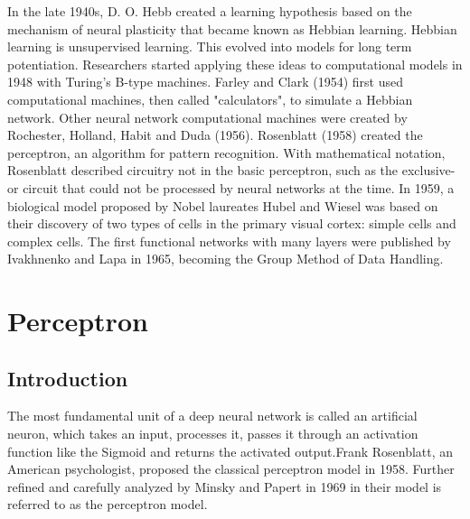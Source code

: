 \documentclass[12pt,times,a4paper]{report}
\begin{document}
{{\begin{normalsize}
In the late 1940s, D. O. Hebb created a learning hypothesis based on the mechanism of neural plasticity that became known as Hebbian learning. Hebbian learning is unsupervised learning. This evolved into models for long term potentiation. Researchers started applying these ideas to computational models in 1948 with Turing's B-type machines. Farley and Clark (1954) first used computational machines, then called "calculators", to simulate a Hebbian network. Other neural network computational machines were created by Rochester, Holland, Habit and Duda (1956). Rosenblatt (1958) created the perceptron, an algorithm for pattern recognition. With mathematical notation, Rosenblatt described circuitry not in the basic perceptron, such as the exclusive-or circuit that could not be processed by neural networks at the time. In 1959, a biological model proposed by Nobel laureates Hubel and Wiesel was based on their discovery of two types of cells in the primary visual cortex: simple cells and complex cells. The first functional networks with many layers were published by Ivakhnenko and Lapa in 1965, becoming the Group Method of Data Handling.


\chapter{\fontsize{16}{14}\textbf{Perceptron\hfill}}

\section{Introduction}

\par
The most fundamental unit of a deep neural network is called an artificial neuron, which takes an input, processes it, passes it through an activation function like the Sigmoid and returns the activated output.Frank Rosenblatt, an American psychologist, proposed the classical perceptron model in 1958. Further refined and carefully analyzed by Minsky and Papert in 1969 in their model is referred to as the perceptron model.

\begin{figure}[H]
\begin{center}
\caption{}
\end{center}
\end{figure}


\end{normalsize}}}
\end{document}
